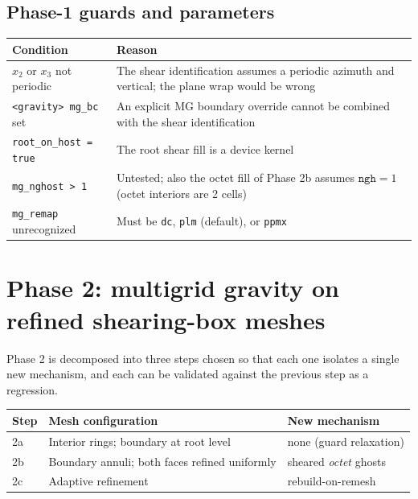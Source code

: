 \documentclass[11pt]{article}
\newcommand{\code}[1]{\texttt{#1}}
\begin{document}
\subsection{Phase-1 guards and parameters}

\begin{center}
\small
\begin{tabular}{@{}lp{8.3cm}@{}}
\toprule
Condition & Reason \\
\midrule
$x_2$ or $x_3$ not periodic & The shear identification assumes a periodic azimuth and
vertical; the plane wrap would be wrong \\
\code{<gravity> mg\_bc} set & An explicit MG boundary override cannot be combined with
the shear identification \\
\code{root\_on\_host = true} & The root shear fill is a device kernel \\
\code{mg\_nghost > 1} & Untested; also the octet fill of Phase 2b assumes
$\code{ngh}=1$ (octet interiors are 2 cells) \\
\code{mg\_remap} unrecognized & Must be \code{dc}, \code{plm} (default), or \code{ppmx} \\
\bottomrule
\end{tabular}
\end{center}

\section{Phase 2: multigrid gravity on refined shearing-box meshes}
\label{sec:phase2}

Phase 2 is decomposed into three steps chosen so that each one isolates a single new
mechanism, and each can be validated against the previous step as a regression.

\begin{center}
\small
\begin{tabular}{@{}lll@{}}
\toprule
Step & Mesh configuration & New mechanism \\
\midrule
2a & Interior rings; boundary at root level & none (guard relaxation) \\
2b & Boundary annuli; both faces refined uniformly & sheared \emph{octet} ghosts \\
2c & Adaptive refinement & rebuild-on-remesh \\
\bottomrule
\end{tabular}
\end{center}
\end{document}
